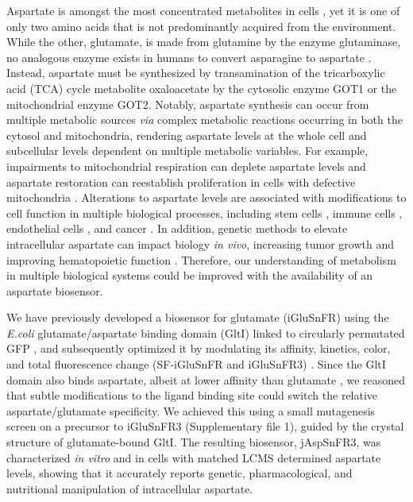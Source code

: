 \documentclass[9pt,lineno]{elife}
\begin{document}
Aspartate is amongst the most concentrated metabolites in cells \citep{Park2016-ap}, yet it is one of only two amino acids that is not predominantly acquired from the environment.
While the other, glutamate, is made from glutamine by the enzyme glutaminase, no analogous enzyme exists in humans to convert asparagine to aspartate \citep{Sullivan2018-gz}.
Instead, aspartate must be synthesized by transamination of the tricarboxylic acid (TCA) cycle metabolite oxaloacetate by the cytosolic enzyme GOT1 or the mitochondrial enzyme GOT2.
Notably, aspartate synthesis can occur from multiple metabolic sources \textit{via} complex metabolic reactions occurring in both the cytosol and mitochondria, rendering aspartate levels at the whole cell and subcellular levels dependent on multiple metabolic variables.
For example, impairments to mitochondrial respiration can deplete aspartate levels and aspartate restoration can reestablish proliferation in cells with defective mitochondria \citep{Sullivan2015-xf, Birsoy2015-pg, Cardaci2015-xy, Hart2023-gp}.
Alterations to aspartate levels are associated with modifications to cell function in multiple biological processes, including stem cells \citep{Tournaire2022-ut, Arnold2022-ft}, immune cells \citep{Bailis2019-mf}, endothelial cells \citep{Diebold2019-hh}, and cancer \citep{Helenius2021-ht}.
In addition, genetic methods to elevate intracellular aspartate can impact biology \textit{in vivo}, increasing tumor growth \citep{Sullivan2018-gz, Garcia-Bermudez2018-mj} and improving hematopoietic function \citep{Qi2021-jv}.
Therefore, our understanding of metabolism in multiple biological systems could be improved with the availability of an aspartate biosensor.

We have previously developed a biosensor for glutamate (iGluSnFR) using the \textit{E.coli} glutamate/aspartate binding domain (GltI) linked to circularly permutated GFP \citep{Marvin2013-qq}, and subsequently optimized it by modulating its affinity, kinetics, color, and total fluorescence change (SF-iGluSnFR and iGluSnFR3) \citep{Marvin2018-ks, Aggarwal2023-pi}.
Since the GltI domain also binds aspartate, albeit at lower affinity than glutamate  \citep{Hu2008-nd}, we reasoned that subtle modifications to the ligand binding site could switch the relative aspartate/glutamate specificity.
We achieved this using a small mutagenesis screen on a precursor to iGluSnFR3 (Supplementary file 1), guided by the crystal structure of glutamate-bound GltI.
The resulting biosensor, jAspSnFR3, was characterized \textit{in vitro} and in cells with matched LCMS determined aspartate levels, showing that it accurately reports genetic, pharmacological, and nutritional manipulation of intracellular aspartate.
\end{document}
